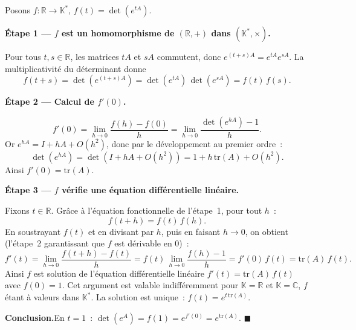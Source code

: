 \begin{mdframed}[style=proofbar]
  Posons $f : \mathbb{R} \to \mathbb{K}^*$, $f(t) = \det(e^{tA})$.

  \medskip
  \textbf{Étape 1 — $f$ est un homomorphisme de $(\mathbb{R},+)$ dans
  $(\mathbb{K}^*,\times)$.}

  Pour tous $t, s \in \mathbb{R}$, les matrices $tA$ et $sA$ commutent,
  donc $e^{(t+s)A} = e^{tA}e^{sA}$. La multiplicativité du déterminant donne
  \[
    f(t+s) = \det(e^{(t+s)A}) = \det(e^{tA})\,\det(e^{sA}) = f(t)\,f(s).
  \]

  \medskip
  \textbf{Étape 2 — Calcul de $f'(0)$.}

  \[
    f'(0) = \lim_{h \to 0}\frac{f(h) - f(0)}{h}
           = \lim_{h \to 0}\frac{\det(e^{hA}) - 1}{h}.
  \]
  Or $e^{hA} = I + hA + O(h^2)$, donc par le développement au premier ordre~:
  \[
    \det(e^{hA}) = \det(I + hA + O(h^2)) = 1 + h\,\mathrm{tr}(A) + O(h^2).
  \]
  Ainsi $f'(0) = \mathrm{tr}(A)$.

  \medskip
  \textbf{Étape 3 — $f$ vérifie une équation différentielle linéaire.}

  Fixons $t \in \mathbb{R}$. Grâce à l'équation fonctionnelle de l'étape~1,
  pour tout $h$~:
  \[
    f(t+h) = f(t)\,f(h).
  \]
  En soustrayant $f(t)$ et en divisant par $h$, puis en faisant $h \to 0$, on
  obtient (l'étape~2 garantissant que $f$ est dérivable en $0$)~:
  \[
    f'(t) = \lim_{h\to 0}\frac{f(t+h)-f(t)}{h}
          = f(t)\,\lim_{h\to 0}\frac{f(h)-1}{h}
          = f'(0)\,f(t) = \mathrm{tr}(A)\,f(t).
  \]
  Ainsi $f$ est solution de l'équation différentielle linéaire
  $f'(t) = \mathrm{tr}(A)\,f(t)$ avec $f(0)=1$. Cet argument est valable
  indifféremment pour $\mathbb{K}=\mathbb{R}$ et $\mathbb{K}=\mathbb{C}$, $f$
  étant à valeurs dans $\mathbb{K}^*$. La solution est unique~:
  $f(t) = e^{t\,\mathrm{tr}(A)}$.

  \medskip
  \textbf{Conclusion.}\enspace En $t = 1$~:
  $\det(e^A) = f(1) = e^{f'(0)} = e^{\mathrm{tr}(A)}$. \hfill$\blacksquare$
\end{mdframed}

\decsep{}


